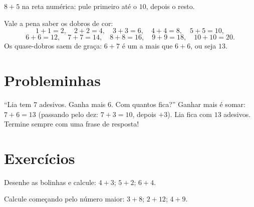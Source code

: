 \begin{omfigure}

{\small $8 + 5$ na reta numérica: pule primeiro até o $10$, depois o
resto.}
\end{omfigure}

\begin{example}[Dobros]\label{ex:g1:addition:doubles}
Vale a pena saber os dobros de cor:
\[
1+1=2, \quad 2+2=4, \quad 3+3=6, \quad 4+4=8, \quad 5+5=10,
\]
\[
6+6=12, \quad 7+7=14, \quad 8+8=16, \quad 9+9=18, \quad 10+10=20 .
\]
Os quase-dobros saem de graça: $6 + 7$ é um a mais que $6 + 6$, ou
seja $13$.
\end{example}

\section{Probleminhas}

\begin{example}\label{ex:g1:addition:problem}
``Lia tem $7$ adesivos. Ganha mais $6$. Com quantos fica?'' Ganhar
mais é somar: $7 + 6 = 13$ (passando pelo dez: $7 + 3 = 10$, depois
$+3$). Lia fica com $13$ adesivos. Termine sempre com uma frase de
resposta!
\end{example}

\section{Exercícios}

\begin{exercise}[$\star$]\label{exo:g1:addition:1}
Desenhe as bolinhas e calcule: $4 + 3$; \quad $5 + 2$; \quad
$6 + 4$.
\end{exercise}

\begin{exercise}[$\star$]\label{exo:g1:addition:2}
Calcule começando pelo número maior: $3 + 8$; \quad
$2 + 12$; \quad $4 + 9$.
\end{exercise}

